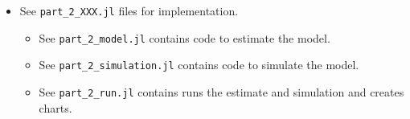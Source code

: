 \documentclass{article}
\begin{document}
\begin{itemize}
\item See \texttt{part\_2\_XXX.jl} files for implementation.

\begin{itemize}
\item See \texttt{part\_2\_model.jl} contains code to estimate the model.
\item See \texttt{part\_2\_simulation.jl} contains code to simulate the model.
\item See \texttt{part\_2\_run.jl} contains runs the estimate and simulation and creates charts.
\end{itemize}
\end{itemize}
\end{document}
